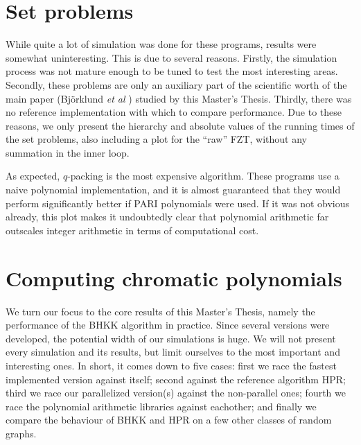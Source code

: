 \documentclass{cslthse-msc}
\begin{document}
\section{Set problems}\label{setproblems_experiment}
While quite a lot of simulation was done for these programs, results were somewhat uninteresting. This is due to several reasons. Firstly, the simulation process was not mature enough to be tuned to test the most interesting areas. Secondly, these problems are only an auxiliary part of the scientific worth of the main paper (Björklund \emph{et al} \cite{cov_pack}) studied by this Master's Thesis. Thirdly, there was no reference implementation with which to compare performance. Due to these reasons, we only present the hierarchy and absolute values of the running times of the set problems, also including a plot for the ``raw'' FZT, without any summation in the inner loop.
\begin{center}
\end{center}
As expected, $q$-packing is the most expensive algorithm. These programs use a naive polynomial implementation, and it is almost guaranteed that they would perform significantly better if PARI polynomials were used. If it was not obvious already, this plot makes it undoubtedly clear that polynomial arithmetic far outscales integer arithmetic in terms of computational cost.

\section{Computing chromatic polynomials}
We turn our focus to the core results of this Master's Thesis, namely the performance of the BHKK algorithm in practice. Since several versions were developed, the potential width of our simulations is huge. We will not present every simulation and its results, but limit ourselves to the most important and interesting ones. In short, it comes down to five cases: first we race the fastest implemented version against itself; second against the reference algorithm HPR; third we race our parallelized version(s) against the non-parallel ones; fourth we race the polynomial arithmetic libraries against eachother; and finally we compare the behaviour of BHKK and HPR on a few other classes of random graphs.
\end{document}
